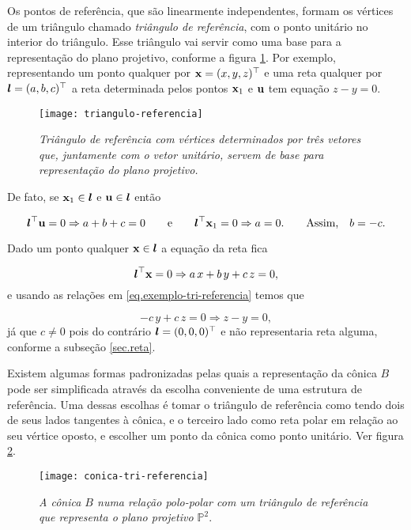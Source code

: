 Os pontos de referência, que são linearmente independentes, formam os vértices de um triângulo chamado \textit{triângulo de referência}, com o ponto unitário no interior do triângulo. Esse triângulo vai servir como uma base para a representação do plano projetivo, conforme a figura \ref{fig.triangulo-referencia}. Por exemplo, representando um ponto qualquer por $\mathbf{x}=(x,y,z)^\top$ e uma reta qualquer por $\boldsymbol{l}=(a,b,c)^\top$ a reta determinada pelos pontos $\mathbf{x}_1$ e ${\bf u}$ tem equação $z-y=0$.

\begin{figure}[!htb]
\centering
\texttt{[image: triangulo-referencia]}
\caption{{\it Triângulo de referência com vértices determinados por três vetores que, juntamente com o vetor unitário, servem de base para representação do plano projetivo.}}
\label{fig.triangulo-referencia}
\end{figure}

De fato, se $\mathbf{x}_1\in\boldsymbol{l}$ e ${\bf u}\in\boldsymbol{l}$ então

\begin{equation}\label{eq.exemplo-tri-referencia}
\boldsymbol{l}^\top{\bf u}=0\Rightarrow a+b+c=0\qquad\text{e}\qquad\boldsymbol{l}^\top\mathbf{x}_1=0\Rightarrow a=0.\qquad\text{Assim,}\quad b=-c.
\end{equation}

Dado um ponto qualquer $\mathbf{x}\in\boldsymbol{l}$ a equação da reta fica

\begin{equation*}
\boldsymbol{l}^\top\mathbf{x}=0\Rightarrow a\,x+b\,y+c\,z=0,
\end{equation*}
e usando as relações em \ref{eq.exemplo-tri-referencia} temos que

\begin{equation*}
-c\,y+c\,z=0\Rightarrow z-y=0,
\end{equation*}
já que $c\neq 0$ pois do contrário $\boldsymbol{l}=(0,0,0)^\top$ e não representaria reta alguma, conforme a subseção \ref{sec.reta}. 

Existem algumas formas padronizadas pelas quais a representação da cônica $B$ pode ser simplificada através da escolha conveniente de uma estrutura de referência. Uma dessas escolhas é tomar o triângulo de referência como tendo dois de seus lados tangentes à cônica, e o terceiro lado como reta polar em relação ao seu vértice oposto, e escolher um ponto  da cônica como ponto unitário. Ver figura \ref{fig.conica-tri-referencia}.

\begin{figure}[!htb]
\centering
\texttt{[image: conica-tri-referencia]}
\caption{{\it A cônica $B$ numa relação polo-polar com um triângulo de referência que representa o plano projetivo $\mathbb{P}^2$}.}
\label{fig.conica-tri-referencia}
\end{figure}

